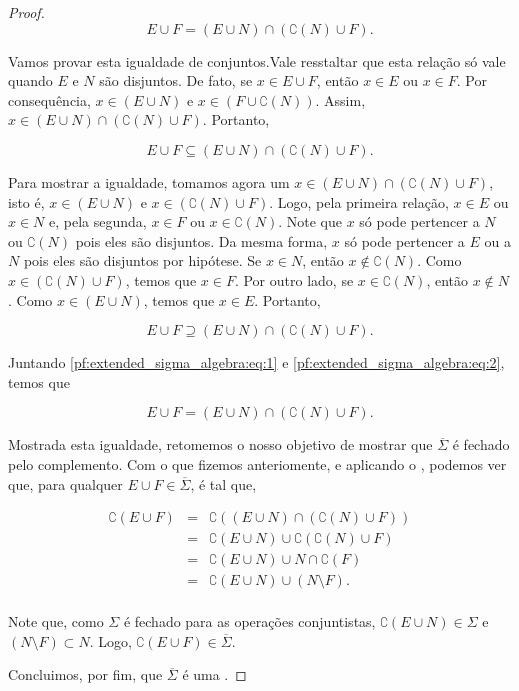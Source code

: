 \begin{proof}
    \begin{equation*}
        E\cup F = (E\cup N) \cap (\complement(N) \cup F).
    \end{equation*}

    Vamos provar esta igualdade de conjuntos.Vale resstaltar que esta relação só vale quando $E$ e $N$ são disjuntos. De fato, se $x\in E\cup F$, então $x\in E$ ou $x\in F$. Por consequência, $x\in (E\cup N)$ e $x\in (F\cup \complement(N))$. Assim, $x\in (E\cup N) \cap (\complement(N) \cup F)$. Portanto,

    \begin{equation}\label{pf:extended_sigma_algebra:eq:1}
        E\cup F \subseteq (E\cup N) \cap (\complement(N) \cup F).
    \end{equation}

    Para mostrar a igualdade, tomamos agora um $x \in (E\cup N) \cap (\complement(N) \cup F)$, isto é, $x \in (E\cup N)$ e $x \in (\complement(N) \cup F)$. Logo, pela primeira relação, $x\in E$ ou $x\in N$ e, pela segunda, $x\in F$ ou $x\in \complement(N)$. Note que $x$ só pode pertencer a $N$ ou $\complement(N)$ pois eles são disjuntos. Da mesma forma, $x$ só pode pertencer a $E$ ou a $N$ pois eles são disjuntos por hipótese. Se $x\in N$, então $x\not\in \complement(N)$. Como $x\in(\complement(N) \cup F)$, temos que $x\in F$. Por outro lado, se $x\in\complement(N)$, então $x\not\in N$. Como $x\in(E\cup N)$, temos que $x\in E$. Portanto,

    \begin{equation}\label{pf:extended_sigma_algebra:eq:2}
        E\cup F \supseteq (E\cup N) \cap (\complement(N) \cup F).
    \end{equation}

    Juntando \ref{pf:extended_sigma_algebra:eq:1} e \ref{pf:extended_sigma_algebra:eq:2}, temos que

    \begin{equation*}
        E\cup F = (E\cup N) \cap (\complement(N) \cup F).
    \end{equation*}

    Mostrada esta igualdade, retomemos o nosso objetivo de mostrar que $\overline{\Sigma}$ é fechado pelo complemento. Com o que fizemos anteriomente, e aplicando o , podemos ver que, para qualquer $E\cup F\in\overline{\Sigma}$, é tal que,

    \begin{eqnarray*}
        \complement(E\cup F) 
        &=& \complement\left((E\cup N) \cap (\complement(N) \cup F)\right)\\
        &=& \complement(E\cup N) \cup \complement(\complement(N) \cup F)\\
        &=& \complement(E\cup N) \cup N \cap \complement(F)\\
        &=& \complement(E\cup N) \cup (N \setminus F).\\
    \end{eqnarray*}

    Note que, como $\Sigma$ é fechado para as operações conjuntistas, $\complement(E\cup N)\in\Sigma$ e $(N \setminus F)\subset N$. Logo, $\complement(E\cup F) \in\overline{\Sigma}$.
    
    Concluimos, por fim, que $\overline{\Sigma}$ é uma .
\end{proof}